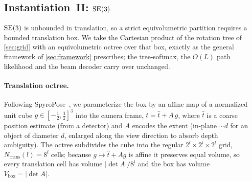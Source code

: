 \subsection{Instantiation~II: \texorpdfstring{$\mathrm{SE}(3)$}{SE(3)}}
\label{sec:se3}

$\mathrm{SE}(3)$ is unbounded in translation, so a strict equivolumetric partition
requires a bounded translation box. We take the Cartesian product of the rotation
tree of \cref{sec:grid} with an equivolumetric octree over that box, exactly as the
general framework of \cref{sec:framework} prescribes; the tree-softmax, the $O(L)$
path likelihood and the beam decoder carry over unchanged.

\paragraph{Translation octree.}
Following SpyroPose~\cite{haugaard2023spyropose}, we parameterize the box by an
affine map of a normalized unit cube $g\in[-\tfrac12,\tfrac12]^3$ into the camera
frame, $t = \hat{t} + A\,g$, where $\hat{t}$ is a coarse position estimate (from a
detector) and $A$ encodes the extent (in-plane $\sim\!d$ for an object of diameter
$d$, enlarged along the view direction to absorb depth ambiguity). The octree
subdivides the cube into the regular $2^{l}\!\times\!2^{l}\!\times\!2^{l}$ grid,
$N_{\text{trans}}(l)=8^{l}$ cells; because $g\mapsto\hat{t}+Ag$ is affine it
preserves equal volume, so every translation cell has volume
$|\!\det A|/8^{l}$ and the box has volume $V_{\text{box}}=|\!\det A|$.

